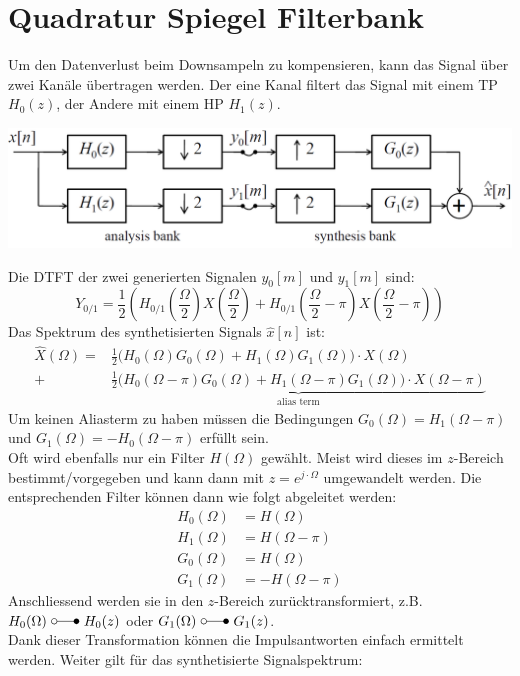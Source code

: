 \section{Quadratur Spiegel Filterbank}
Um den Datenverlust beim Downsampeln zu kompensieren, kann das Signal über zwei
Kanäle übertragen werden. Der eine Kanal filtert das Signal mit einem TP $H_0(z)$,
der Andere mit einem HP $H_1(z)$.
\begin{center}
	\includegraphics[width=.6\textwidth]{../fig/quadrature_mirror}
\end{center}
Die DTFT der zwei generierten Signalen $y_0[m]$ und $y_1[m]$ sind:
\[ Y_{0/1} = \frac{1}{2} \left( H_{0/1}\left( \frac{\Omega}{2} \right)
	X\left( \frac{\Omega}{2} \right) + H_{0/1}\left( \frac{\Omega}{2} - \pi
	\right) X\left( \frac{\Omega}{2} -\pi\right) \right)\]
Das Spektrum des synthetisierten Signals $\hat{x}[n]$ ist:
\[\begin{aligned} \hat{X}(\Omega) = &\frac12 \bigg( H_0(\Omega)G_0(\Omega)
	+ H_1(\Omega)G_1(\Omega) \bigg) \cdot X(\Omega) \\
	+ &\underbrace{\frac12 \bigg( H_0(\Omega-\pi)G_0(\Omega)
	+ H_1(\Omega-\pi)G_1(\Omega) \bigg) \cdot X(\Omega-\pi)}_
	{\textrm{alias term}} \end{aligned}\]
Um keinen Aliasterm zu haben müssen die Bedingungen $G_0(\Omega) = H_1(\Omega
-\pi)$ und $G_1(\Omega) = -H_0(\Omega-\pi)$ erfüllt sein.\\
Oft wird ebenfalls nur ein Filter $H(\Omega)$ gewählt. 
Meist wird dieses im $z$-Bereich bestimmt/vorgegeben und kann dann
mit $z=e^{j\cdot \Omega}$ umgewandelt werden.
Die entsprechenden Filter können dann wie folgt abgeleitet werden:
\[\begin{aligned}
	H_0(\Omega) &= H(\Omega)\\
	H_1(\Omega) &= H(\Omega-\pi)\\
	G_0(\Omega) &= H(\Omega)\\
	G_1(\Omega) &= -H(\Omega-\pi)
\end{aligned}\]
Anschliessend werden sie in den $z$-Bereich zurücktransformiert, z.B. 
$H_0(\Omega) \ \laplace \ H_0(z)$ oder $G_1(\Omega) \ \laplace \ G_1(z)$.\\
Dank dieser Transformation können die Impulsantworten einfach ermittelt werden.
\newpage \noindent
Weiter gilt für das synthetisierte Signalspektrum:
